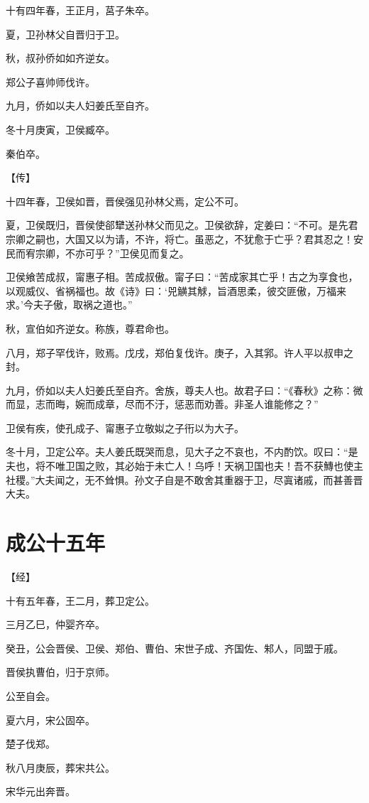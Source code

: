 \documentclass[a4paper,12pt,UTF8,twoside]{ctexbook}
\begin{document}
十有四年春，王正月，莒子朱卒。

夏，卫孙林父自晋归于卫。

秋，叔孙侨如如齐逆女。

郑公子喜帅师伐许。

九月，侨如以夫人妇姜氏至自齐。

冬十月庚寅，卫侯臧卒。

秦伯卒。

【传】

十四年春，卫侯如晋，晋侯强见孙林父焉，定公不可。

夏，卫侯既归，晋侯使郤犫送孙林父而见之。卫侯欲辞，定姜曰：“不可。是先君宗卿之嗣也，大国又以为请，不许，将亡。虽恶之，不犹愈于亡乎？君其忍之！安民而宥宗卿，不亦可乎？”卫侯见而复之。

卫侯飨苦成叔，甯惠子相。苦成叔傲。甯子曰：“苦成家其亡乎！古之为享食也，以观威仪、省祸福也。故《诗》曰：‘兕觵其觩，旨酒思柔，彼交匪傲，万福来求。’今夫子傲，取祸之道也。”

秋，宣伯如齐逆女。称族，尊君命也。

八月，郑子罕伐许，败焉。戊戌，郑伯复伐许。庚子，入其郛。许人平以叔申之封。

九月，侨如以夫人妇姜氏至自齐。舍族，尊夫人也。故君子曰：“《春秋》之称：微而显，志而晦，婉而成章，尽而不汙，惩恶而劝善。非圣人谁能修之？”

卫侯有疾，使孔成子、甯惠子立敬姒之子衎以为大子。

冬十月，卫定公卒。夫人姜氏既哭而息，见大子之不哀也，不内酌饮。叹曰：“是夫也，将不唯卫国之败，其必始于未亡人！乌呼！天祸卫国也夫！吾不获鱄也使主社稷。”大夫闻之，无不耸惧。孙文子自是不敢舍其重器于卫，尽寘诸戚，而甚善晋大夫。

\chapter{成公十五年}


【经】

十有五年春，王二月，葬卫定公。

三月乙巳，仲婴齐卒。

癸丑，公会晋侯、卫侯、郑伯、曹伯、宋世子成、齐国佐、邾人，同盟于戚。



晋侯执曹伯，归于京师。

公至自会。

夏六月，宋公固卒。

楚子伐郑。

秋八月庚辰，葬宋共公。

宋华元出奔晋。
\end{document}
